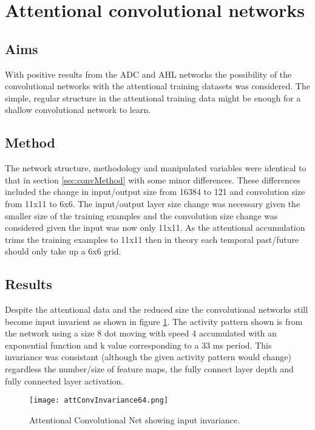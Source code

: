 \section{Attentional convolutional networks}
\subsection{Aims}
With positive results from the ADC and AHL networks the possibility of the convolutional networks with the attentional training datasets was considered. 
The simple, regular structure in the attentional training data might be enough for a shallow convolutional network to learn. 

\subsection{Method}
The network structure, methodology and manipulated variables were identical to that in section \ref{sec:convMethod} with some minor differences.
These differences included the change in input/output size from 16384 to 121 and convolution size from 11x11 to 6x6. 
The input/output layer size change was necessary given the smaller size of the training examples and the convolution size change was considered given the input was now only 11x11.
As the attentional accumulation trims the training examples to 11x11 then in theory each temporal past/future should only take up a 6x6 grid. 

\subsection{Results}
Despite the attentional data and the reduced size the convolutional networks still become input invarient as shown in figure \ref{fig:CAInvariant}.
The activity pattern shown is from the network using a size 8 dot moving with speed 4 accumulated with an exponential function and k value corresponding to a 33 ms period.
This invariance was consistant (although the given activity pattern would change) regardless the number/size of feature maps, the fully connect layer depth and fully connected layer activation.

\begin{figure}[h]
    \centering
    \texttt{[image: attConvInvariance64.png]}
    \caption{Attentional Convolutional Net showing input invariance.}
    \label{fig:CAInvariant}
\end{figure}

